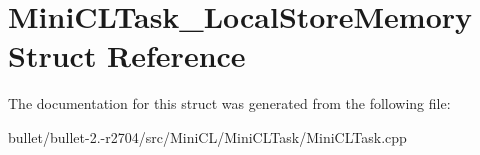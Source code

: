 \hypertarget{struct_mini_c_l_task___local_store_memory}{\section{Mini\+C\+L\+Task\+\_\+\+Local\+Store\+Memory Struct Reference}
\label{struct_mini_c_l_task___local_store_memory}
}


The documentation for this struct was generated from the following file\+:\begin{DoxyCompactItemize}
\item 
bullet/bullet-\/2.-\/r2704/src/\+Mini\+C\+L/\+Mini\+C\+L\+Task/Mini\+C\+L\+Task.\+cpp\end{DoxyCompactItemize}
